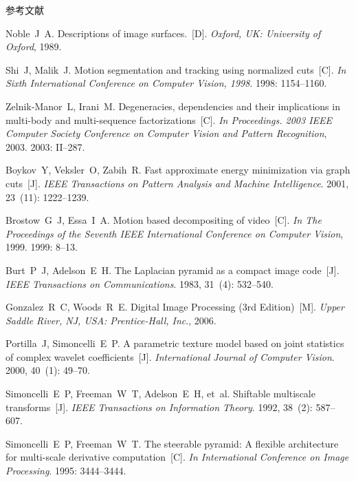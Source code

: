 \documentclass[xcolor=svgnames,serif,table,10pt]{beamer}
\begin{document}
\begin{frame}[allowframebreaks]{参考文献}
\begin{thebibliography}{10}
{\beamertemplatebookbibitems
{}
Noble~J~A.
\newblock Descriptions of image surfaces.~[D].
\newblock \emph{Oxford, UK: University of Oxford}, 1989.}

Shi~J, Malik~J.
\newblock Motion segmentation and tracking using normalized cuts~[C].
\newblock \emph{In Sixth International Conference on Computer Vision, 1998}.
1998:  1154--1160.

Zelnik-Manor~L, Irani~M.
\newblock Degeneracies, dependencies and their implications in multi-body and
  multi-sequence factorizations~[C].
\newblock \emph{In Proceedings. 2003 IEEE Computer Society Conference on Computer Vision and
  Pattern Recognition}, 2003.
2003:  II--287.

Boykov~Y, Veksler~O, Zabih~R.
\newblock Fast approximate energy minimization via graph cuts~[J].
\newblock \emph{IEEE Transactions on Pattern Analysis and Machine Intelligence}.
2001, 23~(11):  1222--1239.

Brostow~G~J, Essa~I~A.
\newblock Motion based decompositing of video~[C].
\newblock \emph{In The Proceedings of the Seventh IEEE International Conference on Computer
  Vision}, 1999.
1999:  8--13.

Burt~P~J, Adelson~E~H.
\newblock The Laplacian pyramid as a compact image code~[J].
\newblock \emph{IEEE Transactions on Communications}.
1983, 31~(4):  532--540.

{\beamertemplatebookbibitems
{}
Gonzalez~R~C, Woods~R~E.
\newblock Digital Image Processing (3rd Edition)~[M].
\newblock \emph{Upper Saddle River, NJ, USA: Prentice-Hall, Inc}., 2006.}

Portilla~J, Simoncelli~E~P.
\newblock A parametric texture model based on joint statistics of complex wavelet
  coefficients~[J].
\newblock \emph{International Journal of Computer Vision}.
2000, 40~(1):  49--70.

Simoncelli~E~P, Freeman~W~T, Adelson~E~H, et~al.
\newblock Shiftable multiscale transforms~[J].
\newblock \emph{IEEE Transactions on Information Theory}.
1992, 38~(2):  587--607.

Simoncelli~E~P, Freeman~W~T.
\newblock The steerable pyramid: A flexible architecture for multi-scale derivative
  computation~[C].
\newblock \emph{In International Conference on Image Processing}.
1995:  3444--3444.


\end{thebibliography}
\end{frame}
\end{document}
